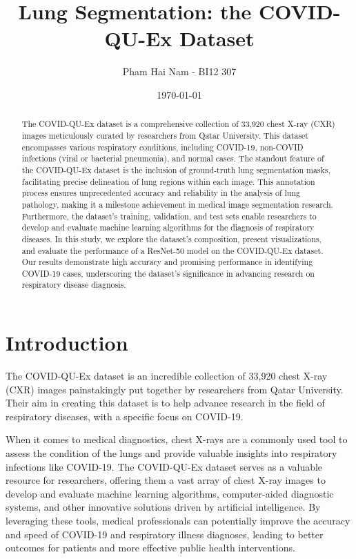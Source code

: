 \documentclass{article}
\title{Lung Segmentation: the COVID-QU-Ex Dataset }
\author{Pham Hai Nam - BI12 307}
\date{\today}
\begin{document}
\maketitle
\begin{abstract}
The COVID-QU-Ex dataset is a comprehensive collection of 33,920 chest X-ray (CXR) images meticulously curated by researchers from Qatar University. This dataset encompasses various respiratory conditions, including COVID-19, non-COVID infections (viral or bacterial pneumonia), and normal cases. The standout feature of the COVID-QU-Ex dataset is the inclusion of ground-truth lung segmentation masks, facilitating precise delineation of lung regions within each image. This annotation process ensures unprecedented accuracy and reliability in the analysis of lung pathology, making it a milestone achievement in medical image segmentation research. Furthermore, the dataset's training, validation, and test sets enable researchers to develop and evaluate machine learning algorithms for the diagnosis of respiratory diseases. In this study, we explore the dataset's composition, present visualizations, and evaluate the performance of a ResNet-50 model on the COVID-QU-Ex dataset. Our results demonstrate high accuracy and promising performance in identifying COVID-19 cases, underscoring the dataset's significance in advancing research on respiratory disease diagnosis.
\end{abstract}
\newpage
\section{Introduction}
The COVID-QU-Ex dataset is an incredible collection of 33,920 chest X-ray (CXR) images painstakingly put together by researchers from Qatar University. 
Their aim in creating this dataset is to help advance research in the field of respiratory diseases, with a specific focus on COVID-19.

When it comes to medical diagnostics, chest X-rays are a commonly used tool to assess the condition of the lungs and provide valuable insights into respiratory infections like COVID-19. 
The COVID-QU-Ex dataset serves as a valuable resource for researchers, offering them a vast array of chest X-ray images to develop and evaluate machine learning algorithms, computer-aided diagnostic systems, and other innovative solutions driven by artificial intelligence. By leveraging these tools, medical professionals can potentially improve the accuracy and speed of COVID-19 and respiratory illness diagnoses, leading to better outcomes for patients and more effective public health interventions.
\end{document}
